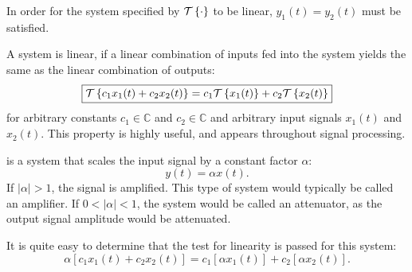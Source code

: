 \begin{marginfigure}[-3cm]
\begin{center}
\end{center}
\label{fig:linearity_block}
\caption{In order for the system specified by $\mathcal{T}\left\{\cdot\right\}$ to be linear, $y_1(t) = y_2(t)$ must be satisfied.}
\end{marginfigure}

A system is linear, if a linear combination of inputs fed into the system yields the same as the linear combination of outputs:
\begin{equation}
\boxed{
\spop[c_1 x_1(t) + c_2 x_2(t)] = c_1 \spop[x_1(t)] + c_2 \spop[ x_2(t) ]}
\label{def:linear_sys}
\end{equation}
for arbitrary constants $c_1 \in \mathbb{C}$ and $c_2 \in \mathbb{C}$ and arbitrary input signals $x_1(t)$ and $x_2(t)$. This property is highly useful, and appears throughout signal processing.

 is a system that scales the input signal by a constant factor $\alpha$:
\begin{equation}
  y(t) = \alpha x(t).
\end{equation}
If $|\alpha| >1$, the signal is amplified. This type of system would typically be called an amplifier. If $0<|\alpha|<1$, the system would be called an attenuator, as the output signal amplitude would be attenuated.

It is quite easy to determine that the test for linearity is passed for this system:
\begin{equation}
\alpha [c_1 x_1(t) + c_2 x_2(t)] = c_1 [\alpha x_1(t)] + c_2 [\alpha x_2(t)].
\end{equation}

